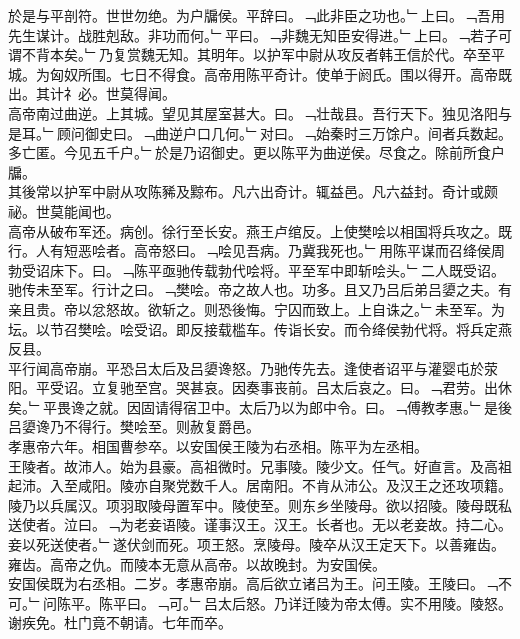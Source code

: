 \documentclass{zhvt-classic}
\begin{document}
\hspace*{2em}於是与平剖符。世世勿绝。为户牖侯。平辞曰。﹁此非臣之功也。﹂上曰。﹁吾用先生谋计。战胜剋敌。非功而何。﹂平曰。﹁非魏无知臣安得进。﹂上曰。﹁若子可谓不背本矣。﹂乃复赏魏无知。其明年。以护军中尉从攻反者韩王信於代。卒至平城。为匈奴所围。七日不得食。高帝用陈平奇计。使单于阏氏。围以得开。高帝既出。其计礻必。世莫得闻。\\
\hspace*{2em}高帝南过曲逆。上其城。望见其屋室甚大。曰。﹁壮哉县。吾行天下。独见洛阳与是耳。﹂顾问御史曰。﹁曲逆户口几何。﹂对曰。﹁始秦时三万馀户。间者兵数起。多亡匿。今见五千户。﹂於是乃诏御史。更以陈平为曲逆侯。尽食之。除前所食户牖。\\
\hspace*{2em}其後常以护军中尉从攻陈豨及黥布。凡六出奇计。辄益邑。凡六益封。奇计或颇祕。世莫能闻也。\\
\hspace*{2em}高帝从破布军还。病创。徐行至长安。燕王卢绾反。上使樊哙以相国将兵攻之。既行。人有短恶哙者。高帝怒曰。﹁哙见吾病。乃冀我死也。﹂用陈平谋而召绛侯周勃受诏床下。曰。﹁陈平亟驰传载勃代哙将。平至军中即斩哙头。﹂二人既受诏。驰传未至军。行计之曰。﹁樊哙。帝之故人也。功多。且又乃吕后弟吕嬃之夫。有亲且贵。帝以忿怒故。欲斩之。则恐後悔。宁囚而致上。上自诛之。﹂未至军。为坛。以节召樊哙。哙受诏。即反接载槛车。传诣长安。而令绛侯勃代将。将兵定燕反县。\\
\hspace*{2em}平行闻高帝崩。平恐吕太后及吕嬃谗怒。乃驰传先去。逢使者诏平与灌婴屯於荥阳。平受诏。立复驰至宫。哭甚哀。因奏事丧前。吕太后哀之。曰。﹁君劳。出休矣。﹂平畏谗之就。因固请得宿卫中。太后乃以为郎中令。曰。﹁傅教孝惠。﹂是後吕嬃谗乃不得行。樊哙至。则赦复爵邑。\\
\hspace*{2em}孝惠帝六年。相国曹参卒。以安国侯王陵为右丞相。陈平为左丞相。\\
\hspace*{2em}王陵者。故沛人。始为县豪。高祖微时。兄事陵。陵少文。任气。好直言。及高祖起沛。入至咸阳。陵亦自聚党数千人。居南阳。不肯从沛公。及汉王之还攻项籍。陵乃以兵属汉。项羽取陵母置军中。陵使至。则东乡坐陵母。欲以招陵。陵母既私送使者。泣曰。﹁为老妾语陵。谨事汉王。汉王。长者也。无以老妾故。持二心。妾以死送使者。﹂遂伏剑而死。项王怒。烹陵母。陵卒从汉王定天下。以善雍齿。雍齿。高帝之仇。而陵本无意从高帝。以故晚封。为安国侯。\\
\hspace*{2em}安国侯既为右丞相。二岁。孝惠帝崩。高后欲立诸吕为王。问王陵。王陵曰。﹁不可。﹂问陈平。陈平曰。﹁可。﹂吕太后怒。乃详迁陵为帝太傅。实不用陵。陵怒。谢疾免。杜门竟不朝请。七年而卒。\\
\end{document}

